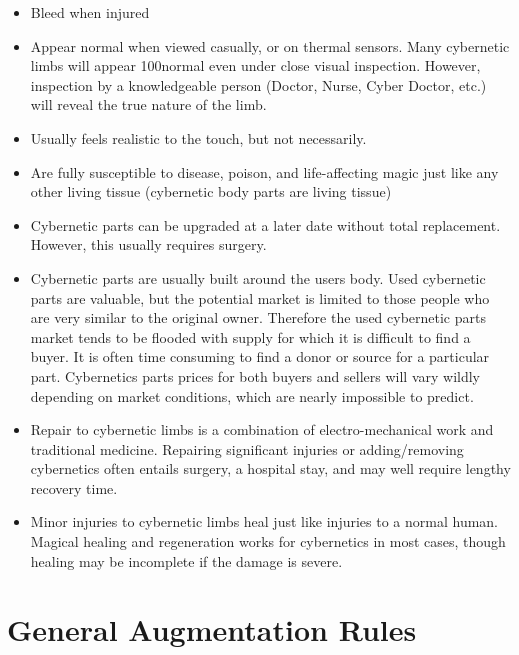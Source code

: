 \documentclass[twoside]{book}
\begin{document}
\begin{itemize}
      
  \item Bleed when injured
  \item Appear normal when viewed casually, or on thermal sensors. Many cybernetic limbs will appear 100normal even under close visual inspection. However, inspection by a knowledgeable person (Doctor, Nurse, Cyber Doctor, etc.) will reveal the true nature of the limb.
  \item Usually feels realistic to the touch, but not necessarily.
  \item Are fully susceptible to disease, poison, and life-affecting magic just like any other living tissue (cybernetic body parts are living tissue)
  \item Cybernetic parts can be upgraded at a later date without total replacement. However, this usually requires surgery.
  \item Cybernetic parts are usually built around the users body. Used cybernetic parts are valuable, but the potential market is limited to those people who are very similar to the original owner. Therefore the used cybernetic parts market tends to be flooded with supply for which it is difficult to find a buyer. It is often time consuming to find a donor or source for a particular part. Cybernetics parts prices for both buyers and sellers will vary wildly depending on market conditions, which are nearly impossible to predict.
  \item Repair to cybernetic limbs is a combination of electro-mechanical work and traditional medicine. Repairing significant injuries or adding/removing cybernetics often entails surgery, a hospital stay, and may well require lengthy recovery time.
  \item Minor injuries to cybernetic limbs heal just like injuries to a normal human. Magical healing and regeneration works for cybernetics in most cases, though healing may be incomplete if the damage is severe.
\end{itemize}
  
    

\section{General Augmentation Rules}
    
\end{document}
